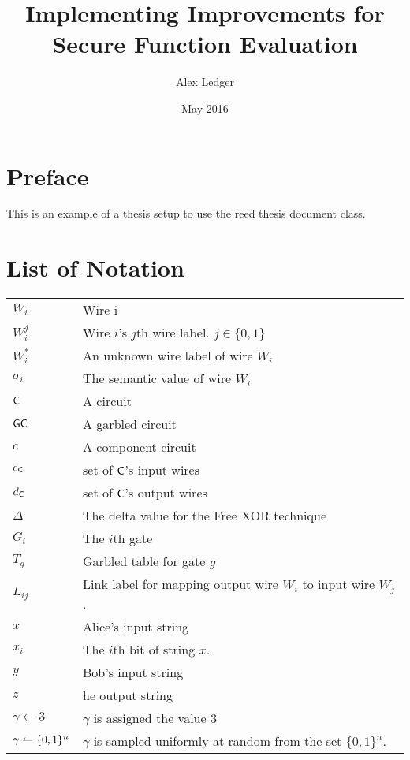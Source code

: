 \documentclass[12pt,twoside]{reedthesis}
\title{Implementing Improvements for Secure Function Evaluation}
\author{Alex Ledger}
\date{May 2016}
\begin{document}
\maketitle
\frontmatter %
\pagestyle{empty} %





\chapter*{Preface}
This is an example of a thesis setup to use the reed thesis document class.

\chapter*{List of Notation}

\begin{table}[h]
\centering %
\begin{tabular}{ll}
    $W_i$ & Wire i \\
    $W_i^j$ & Wire $i$'s $j$th wire label. $j \in \{0,1\}$ \\
    $W_i^*$ & An unknown wire label of wire $W_i$ \\
    $\sigma_i$ & The semantic value of wire $W_i$ \\
    $\sf {C}$ & A circuit \\
    $\sf {GC}$ & A garbled circuit \\
    $c$ & A component-circuit \\
    $e_{\sf {C}}$ & set of $\sf {C}$'s input wires \\
    $d_{\sf {C}}$ & set of $\sf {C}$'s output wires \\
    $\Delta$ & The delta value for the Free XOR technique \\
    $G_i$ & The $i$th gate \\
    $T_g$  & Garbled table for gate $g$ \\
    $L_{ij}$ & Link label for mapping output wire $W_i$ to input wire $W_j$. \\
    $x$ & Alice's input string \\
    $x_i$ & The $i$th bit of string $x$. \\
    $y$ & Bob's input string \\
    $z$ & he output string \\
    $\gamma \gets 3$ & $\gamma$ is assigned the value $3$ \\
    $\gamma \leftharpoonup \{0,1\}^n$ & $\gamma$ is sampled uniformly at random from the set $\{0,1\}^n$. \\
\end{tabular}
\end{table}
	
\end{document}
